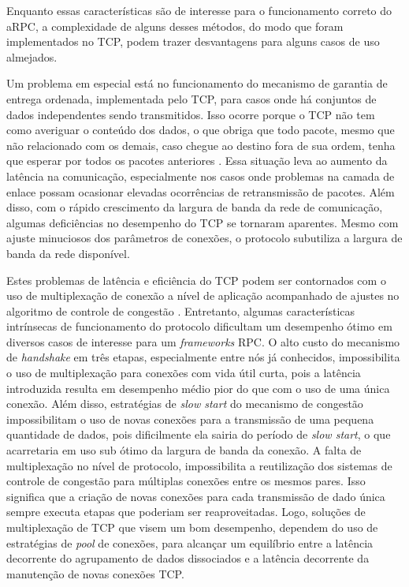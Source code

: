Enquanto essas características são de interesse para o funcionamento correto do aRPC, a complexidade de alguns desses métodos, do modo que foram implementados no TCP, podem trazer desvantagens para alguns casos de uso almejados.

Um problema em especial está no funcionamento do mecanismo de garantia de entrega ordenada, implementada pelo TCP, para casos onde há conjuntos de dados independentes sendo transmitidos. Isso ocorre porque o TCP não tem como averiguar o conteúdo dos dados, o que obriga que todo pacote, mesmo que não relacionado com os demais, caso chegue ao destino fora de sua ordem, tenha que esperar por todos os pacotes anteriores \cite{scharf2006nxg03}. Essa situação leva ao aumento da latência na comunicação, especialmente nos casos onde problemas na camada de enlace possam ocasionar elevadas ocorrências de retransmissão de pacotes. Além disso, com o rápido crescimento da largura de banda da rede de comunicação, algumas deficiências no desempenho do TCP se tornaram aparentes. Mesmo com ajuste minuciosos dos parâmetros de conexões, o protocolo subutiliza a largura de banda da rede disponível. 

Estes problemas de latência e eficiência do TCP podem ser contornados com o uso de multiplexação de conexão a nível de aplicação acompanhado de ajustes no algoritmo de controle de congestão \cite{rfc5681}.
Entretanto, algumas características intrínsecas de funcionamento do protocolo dificultam um desempenho ótimo em diversos casos de interesse para um \textit{frameworks} RPC. O alto custo do mecanismo de \textit{handshake} em três etapas, especialmente entre nós já conhecidos, impossibilita o uso de multiplexação para conexões com vida útil curta, pois a latência introduzida resulta em desempenho médio pior do que com o uso de uma única conexão. Além disso, estratégias de \textit{slow start} do mecanismo de congestão impossibilitam o uso de novas conexões para a transmissão de uma pequena quantidade de dados, pois dificilmente ela sairia do período de \textit{slow start}, o que acarretaria em uso sub ótimo da largura de banda da conexão. A falta de multiplexação no nível de protocolo, impossibilita a reutilização dos sistemas de controle de congestão para múltiplas conexões entre os mesmos pares. Isso significa que a criação de novas conexões para cada transmissão de dado única sempre executa etapas que poderiam ser reaproveitadas. Logo, soluções de multiplexação de TCP que visem um bom desempenho, dependem do uso de estratégias de \emph{pool} de conexões, para alcançar um equilíbrio entre a latência decorrente do agrupamento de dados dissociados e a latência decorrente da manutenção de novas conexões TCP.

